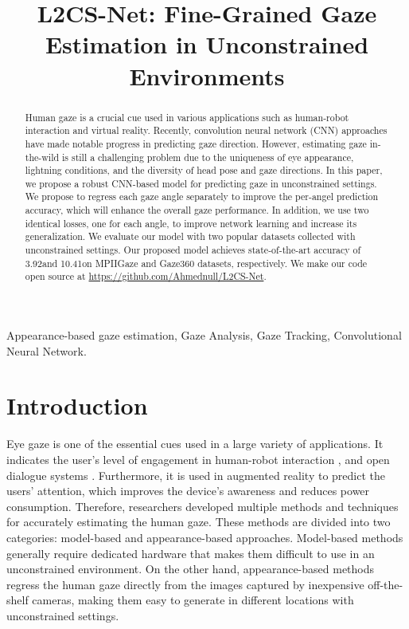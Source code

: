 \documentclass{article}
\title{L2CS-Net: Fine-Grained Gaze Estimation in Unconstrained Environments}
\begin{document}
\maketitle
\begin{abstract}
Human gaze is a crucial cue used in various applications such as human-robot interaction and virtual reality. Recently, convolution neural network (CNN) approaches have made notable progress in predicting gaze direction. However, estimating gaze in-the-wild is still a challenging problem due to the uniqueness of eye appearance, lightning conditions, and the diversity of head pose and gaze directions. In this paper, we propose a robust CNN-based model for predicting gaze in unconstrained settings. We propose to regress each gaze angle separately to improve the per-angel prediction accuracy, which will enhance the overall gaze performance. In addition, we use two identical losses, one for each angle, to improve network learning and increase its generalization. We evaluate our model with two popular datasets collected with unconstrained settings. Our proposed model achieves state-of-the-art accuracy of 3.92\degree and 10.41\degree on MPIIGaze and Gaze360 datasets, respectively. We make our code open source at \url{https://github.com/Ahmednull/L2CS-Net}.
\end{abstract}
\begin{keywords}
Appearance-based gaze estimation, Gaze Analysis, Gaze Tracking, Convolutional Neural Network.
\end{keywords}
\section{Introduction}
\label{sec:intro}
\thispagestyle{FirstPage}
Eye gaze is one of the essential cues used in a large variety of applications. It indicates the user's level of engagement in human-robot interaction \cite{hempel2020slam,strazdas2022robot}, and open dialogue systems \cite{li2012vision}. Furthermore, it is used in augmented reality \cite{patney2016towards} to predict the users' attention, which improves the device's awareness and reduces power consumption. Therefore, researchers developed multiple methods and techniques for accurately estimating the human gaze. These methods are divided into two categories: model-based and appearance-based approaches. Model-based methods generally require dedicated hardware that makes them difficult to use in an unconstrained environment. On the other hand, appearance-based methods regress the human gaze directly from the images captured by inexpensive off-the-shelf cameras, making them easy to generate in different locations with unconstrained settings.
\end{document}
